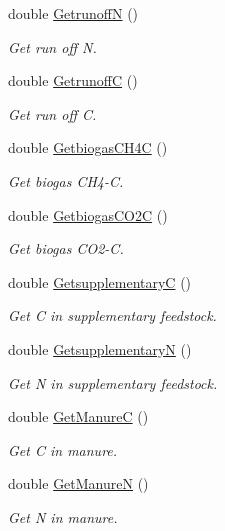 \begin{DoxyCompactItemize}
double \mbox{\hyperlink{classmanure_store_ac69d09e89778d0b12e1b8d77542a8539}{GetrunoffN}} ()
\begin{DoxyCompactList}\small\item\em Get run off N. \end{DoxyCompactList}\item 
double \mbox{\hyperlink{classmanure_store_aa996a044259ad5c54695a89f404d671a}{GetrunoffC}} ()
\begin{DoxyCompactList}\small\item\em Get run off C. \end{DoxyCompactList}\item 
double \mbox{\hyperlink{classmanure_store_a634f58e84c82d2ef7110cd1081a41c17}{Getbiogas\+C\+H4C}} ()
\begin{DoxyCompactList}\small\item\em Get biogas C\+H4-\/C. \end{DoxyCompactList}\item 
double \mbox{\hyperlink{classmanure_store_af22fab8168a04dc58b1867edf8156d8b}{Getbiogas\+C\+O2C}} ()
\begin{DoxyCompactList}\small\item\em Get biogas C\+O2-\/C. \end{DoxyCompactList}\item 
double \mbox{\hyperlink{classmanure_store_add321ae5ffcd148e411d00494d9fe890}{GetsupplementaryC}} ()
\begin{DoxyCompactList}\small\item\em Get C in supplementary feedstock. \end{DoxyCompactList}\item 
double \mbox{\hyperlink{classmanure_store_affdd4f35b4bd40bd5293e95c5ff482bf}{GetsupplementaryN}} ()
\begin{DoxyCompactList}\small\item\em Get N in supplementary feedstock. \end{DoxyCompactList}\item 
double \mbox{\hyperlink{classmanure_store_afb0124e830306d9f1bb66b11fc6df6b0}{Get\+ManureC}} ()
\begin{DoxyCompactList}\small\item\em Get C in manure. \end{DoxyCompactList}\item 
double \mbox{\hyperlink{classmanure_store_a8013be8424d3ea1875bab33f4ca48089}{Get\+ManureN}} ()
\begin{DoxyCompactList}\small\item\em Get N in manure. \end{DoxyCompactList}\item 

\end{DoxyCompactItemize}
